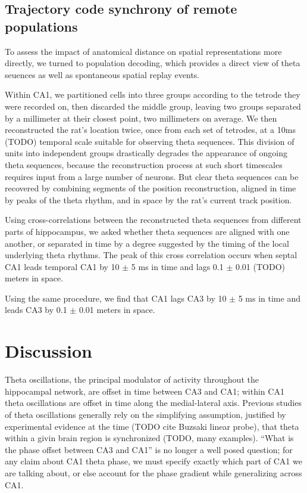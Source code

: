 \documentclass[10pt]{article}
\begin{document}
\subsection*{Trajectory code synchrony of remote populations}
To assess the impact of anatomical distance on spatial representations more directly, we turned to population decoding, which provides a direct view of theta seuences as well as spontaneous spatial replay events. 

Within CA1, we partitioned cells into three groups according to the tetrode they were recorded on, then discarded the middle group, leaving two groups separated by a millimeter at their closest point, two millimeters on average. We then reconstructed the rat's location twice, once from each set of tetrodes, at a 10ms (TODO) temporal scale suitable for observing theta sequences. This division of units into independent groups drastically degrades the appearance of ongoing theta sequences, because the reconstruction process at such short timescales requires input from a large number of neurons. But clear theta sequences can be recovered by combining segments of the position reconstruction, aligned in time by peaks of the theta rhythm, and in space by the rat's current track position.

Using cross-correlations between the reconstructed theta sequences from different parts of hippocampus, we asked whether theta sequences are aligned with one another, or separated in time by a degree suggested by the timing of the local underlying theta rhythms. The peak of this cross correlation occurs when septal CA1 leads temporal CA1 by 10 $\pm$ 5 ms in time and lags 0.1 $\pm$ 0.01 (TODO) meters in space.

Using the same procedure, we find that CA1 lags CA3 by 10 $\pm$ 5 ms in time and leads CA3 by 0.1 $\pm$ 0.01 meters in space.

\section*{Discussion}
Theta oscillations, the principal modulator of activity throughout the hippocampal network, are offset in time between CA3 and CA1; within CA1 theta oscillations are offset in time along the medial-lateral axis. Previous studies of theta oscillations generally rely on the simplifying assumption, justified by experimental evidence at the time (TODO cite Buzsaki linear probe), that theta within a givin brain region is synchronized (TODO, many examples). ``What is the phase offset between CA3 and CA1'' is no longer a well posed question; for any claim about CA1 theta phase, we must specify exactly which part of CA1 we are talking about, or else account for the phase gradient while generalizing across CA1.
\end{document}
